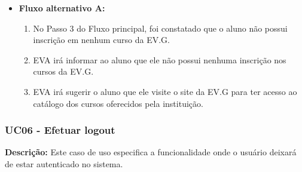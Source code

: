 \begin{itemize}
    \item \textbf{Fluxo alternativo A:}
        \begin{enumerate}
            \item No Passo 3 do Fluxo principal, foi constatado que o aluno não possui inscrição em nenhum curso da EV.G.
            \item EVA irá informar ao aluno que ele não possui nenhuma inscrição nos cursos da EV.G.
            \item EVA irá sugerir o aluno que ele visite o site da EV.G para ter acesso ao catálogo dos cursos oferecidos pela instituição.
        \end{enumerate}
\end{itemize}

    
\subsubsection{UC06 - Efetuar logout}
\textbf{Descrição:} Este caso de uso especifica a funcionalidade onde o usuário deixará de estar autenticado no sistema.

